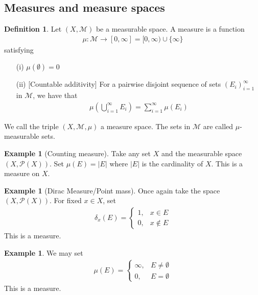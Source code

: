 \documentclass[11pt]{amsart}
\theoremstyle{definition}
\newtheorem{definition}[theorem]{Definition}
\newtheorem{example}[theorem]{Example}
\numberwithin{equation}{section}
\begin{document}
\subsection{Measures and measure spaces}
\begin{definition}
    Let $(X,\mathcal M)$ be a measurable space. A measure is a function
    \begin{align*}
        \mu:\mathcal M\to[0,\infty]=[0,\infty)\cup\{\infty\}
    \end{align*}
    satisfying
    \begin{enumerate}
        \item [(i)] $\mu(\emptyset)=0$
        \item [(ii)][Countable additivity] For a pairwise disjoint sequence of sets $(E_i)_{i=1}^\infty$ in $\mathcal M$, we have that
        \begin{align*}
            \mu(\bigcup_{i=1}^\infty E_i)=\sum_{i=1}^\infty \mu(E_i)
        \end{align*}
    \end{enumerate}
    We call the triple $(X,\mathcal M,\mu)$ a measure space. The sets in $\mathcal M$ are called $\mu$-measurable sets.
\end{definition}
\begin{example}[Counting measure]
    Take any set $X$ and the measurable space $(X,\mathcal P(X))$. Set $\mu(E)=|E|$ where $|E|$ is the cardinality of $X$. This is a measure on $X$.
\end{example}
\begin{example}[Dirac Measure/Point mass]
    Once again take the space $(X,\mathcal P(X))$. For fixed $x\in X$, set 
    \begin{align*}
        \delta_x(E)=\begin{cases}
            1, & x\in E\\
            0, & x\not\in E
        \end{cases}
    \end{align*}
    This is a measure.
\end{example}
\begin{example}
    We may set 
    \begin{align*}
        \mu(E)=\begin{cases}
        \infty, & E\ne\emptyset\\
        0,& E=\emptyset
    \end{cases}
    \end{align*}
    This is a measure.
\end{example}
\end{document}
